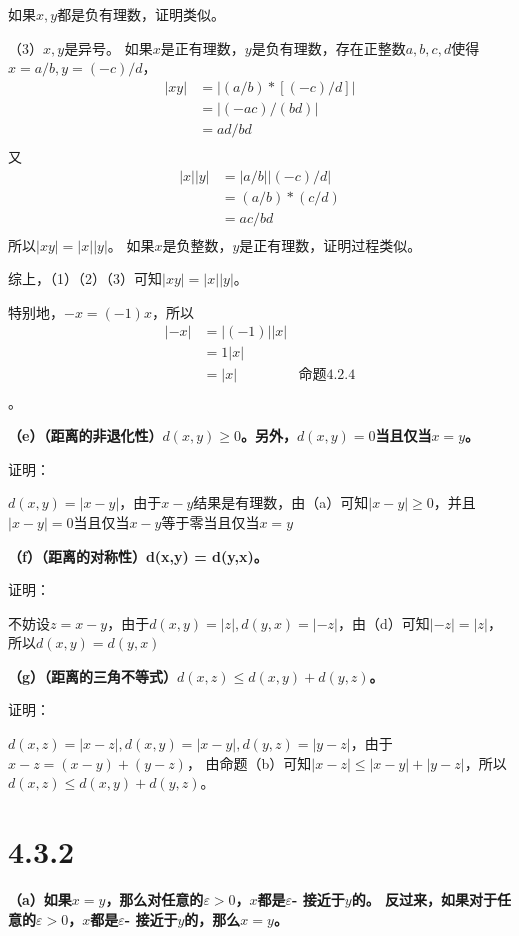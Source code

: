 \documentclass{article}
\theoremstyle{mystyle}
\begin{document}
如果$x,y$都是负有理数，证明类似。

（3）$x,y$是异号。
如果$x$是正有理数，$y$是负有理数，存在正整数$a,b,c,d$使得$x=a/b,y=(-c)/d$，
\begin{align*}
  |xy| & = |(a/b) * [(-c)/d]| \\
       & = |(-ac)/(bd)|       \\
       & = ad/bd              \\
\end{align*}
又
\begin{align*}
  |x||y| & = |a/b||(-c)/d| \\
         & = (a/b) * (c/d) \\
         & = ac/bd         \\
\end{align*}
所以$|xy|=|x||y|$。
如果$x$是负整数，$y$是正有理数，证明过程类似。

综上，（1）（2）（3）可知$|xy|=|x||y|$。

特别地，$-x=(-1)x$，所以
\begin{align*}
  |-x| & =|(-1)||x|                  \\
       & =1|x|                       \\
       & =|x|       & \text{命题4.2.4} \\
\end{align*}。

\textbf{（e）（距离的非退化性）$d(x,y) \geq 0$。另外，$d(x,y)=0$当且仅当$x=y$。 }

证明：

$d(x,y) = |x-y|$，由于$x-y$结果是有理数，由（a）可知$|x-y| \geq 0$，并且$|x-y|=0$当且仅当$x-y$等于零当且仅当$x=y$

\textbf{（f）（距离的对称性）d(x,y) = d(y,x)。}

证明：

不妨设$z = x - y$，由于$d(x,y)=|z|,d(y,x)=|-z|$，由（d）可知$|-z|=|z|$，所以$d(x,y)=d(y,x)$

\textbf{（g）（距离的三角不等式）$d(x,z) \leq d(x,y) + d(y,z)$。}

证明：

$d(x,z)=|x-z|,d(x,y)=|x-y|,d(y,z)=|y-z|$，由于$x-z = (x-y)+(y-z)$，
由命题（b）可知$|x-z| \leq |x-y| + |y-z|$，所以$d(x,z) \leq d(x,y) + d(y,z)$。

\section*{4.3.2}

\textbf{（a）如果$x=y$，那么对任意的$\varepsilon > 0$，$x$都是$\varepsilon$- 接近于$y$的。
  反过来，如果对于任意的$\varepsilon > 0$，$x$都是$\varepsilon$- 接近于$y$的，那么$x=y$。}
\end{document}
